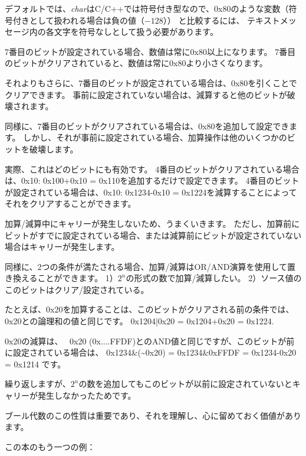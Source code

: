 デフォルトでは、\emph{char}はC/C++では符号付き型なので、0x80のような変数（符号付きとして扱われる場合は負の値（$-128$））
と比較するには、
テキストメッセージ内の各文字を符号なしとして扱う必要があります。

7番目のビットが設定されている場合、数値は常に0x80以上になります。
7番目のビットがクリアされていると、数値は常に0x80より小さくなります。

それよりもさらに、7番目のビットが設定されている場合は、0x80を引くことでクリアできます。
事前に設定されていない場合は、減算すると他のビットが破壊されます。

同様に、7番目のビットがクリアされている場合は、0x80を追加して設定できます。
しかし、それが事前に設定されている場合、加算操作は他のいくつかのビットを破壊します。

実際、これはどのビットにも有効です。
4番目のビットがクリアされている場合は、0x10: 0x100+0x10 = 0x110を追加するだけで設定できます。
4番目のビットが設定されている場合は、0x10: 0x1234-0x10 = 0x1224を減算することによってそれをクリアすることができます。

加算/減算中にキャリーが発生しないため、うまくいきます。
ただし、加算前にビットがすでに設定されている場合、または減算前にビットが設定されていない場合はキャリーが発生します。

同様に、2つの条件が満たされる場合、加算/減算はOR/AND演算を使用して置き換えることができます。
1）$2^n$の形式の数で加算/減算したい。
2）ソース値のこのビットはクリア/設定されている。

たとえば、0x20を加算することは、このビットがクリアされる前の条件では、0x20との論理和の値と同じです。
0x1204|0x20 = 0x1204+0x20 = 0x1224.

0x20の減算は、 ~0x20 (0x....FFDF)とのAND値と同じですが、このビットが前に設定されている場合は、
0x1234\&(\~{}0x20) = 0x1234\&0xFFDF = 0x1234-0x20 = 0x1214 です。

繰り返しますが、$2^n$の数を追加してもこのビットが以前に設定されていないとキャリーが発生しなかったためです。

ブール代数のこの性質は重要であり、それを理解し、心に留めておく価値があります。

この本のもう一つの例：
